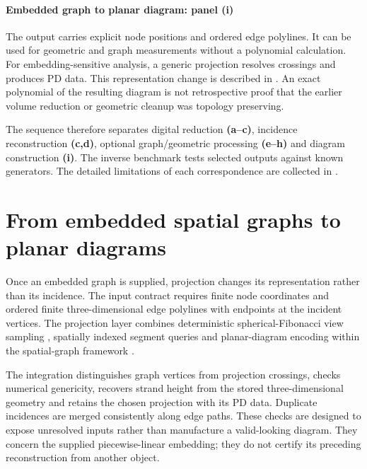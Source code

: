 \documentclass[10pt,twocolumn]{article}
\begin{document}
\paragraph{Embedded graph to planar diagram: panel (i)}
The output carries explicit node positions and ordered edge polylines. It can be used for geometric and graph measurements without a polynomial calculation. For embedding-sensitive analysis, a generic projection resolves crossings and produces PD data. This representation change is described in . An exact polynomial of the resulting diagram is not retrospective proof that the earlier volume reduction or geometric cleanup was topology preserving.

The sequence therefore separates digital reduction \textbf{(a--c)}, incidence reconstruction \textbf{(c,d)}, optional graph/geometric processing \textbf{(e--h)} and diagram construction \textbf{(i)}. The inverse benchmark tests selected outputs against known generators. The detailed limitations of each correspondence are collected in .

\section{From embedded spatial graphs to planar diagrams}
\label{supp:projection}
Once an embedded graph is supplied, projection changes its representation rather than its incidence. The input contract requires finite node coordinates and ordered finite three-dimensional edge polylines with endpoints at the incident vertices. The projection layer combines deterministic spherical-Fibonacci view sampling \cite{kg_keinert2015fibonacci}, spatially indexed segment queries \cite{kg_leutenegger1997str,kg_shapely} and planar-diagram encoding \cite{kg_mastin2015pdcode} within the spatial-graph framework \cite{kg_kauffman1989spatial,kg_flapan2017spatial}.

The integration distinguishes graph vertices from projection crossings, checks numerical genericity, recovers strand height from the stored three-dimensional geometry and retains the chosen projection with its PD data. Duplicate incidences are merged consistently along edge paths. These checks are designed to expose unresolved inputs rather than manufacture a valid-looking diagram. They concern the supplied piecewise-linear embedding; they do not certify its preceding reconstruction from another object.
\end{document}
